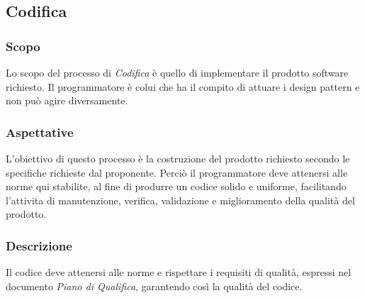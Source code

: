 	\subsection{Codifica}
		\subsubsection{Scopo}
		Lo scopo del processo di \textit{Codifica} è quello di implementare il prodotto software richiesto. Il programmatore è colui che ha il compito di attuare i design pattern e non può agire diversamente.
		\subsubsection{Aspettative}
		L'obiettivo di questo processo è la costruzione del prodotto richiesto secondo le specifiche richieste dal proponente. Perciò il programmatore deve attenersi alle norme qui stabilite, al fine di produrre un codice solido e uniforme, facilitando l'attivita di manutenzione, verifica, validazione e miglioramento della qualità del prodotto.
		\subsubsection{Descrizione}
		Il codice deve attenersi alle norme e rispettare i requisiti di qualità, espressi nel documento \textit{Piano di Qualifica}, garantendo così la qualità del codice.
